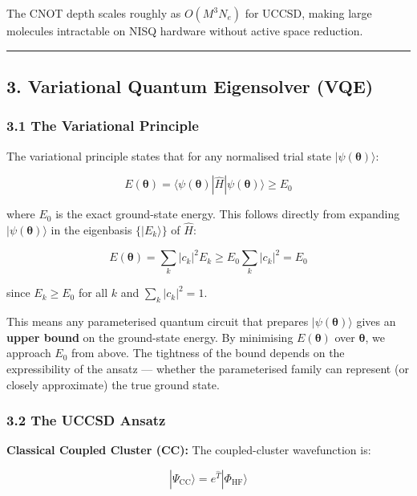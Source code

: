 \documentclass[
  11pt,
]{report}
\begin{document}
The CNOT depth scales roughly as \(O(M^3 N_e)\) for UCCSD, making large
molecules intractable on NISQ hardware without active space reduction.

\begin{center}\rule{0.5\linewidth}{0.5pt}\end{center}

\subsection{3. Variational Quantum Eigensolver
(VQE)}\label{variational-quantum-eigensolver-vqe}

\subsubsection{3.1 The Variational
Principle}\label{the-variational-principle}

The variational principle states that for any normalised trial state
\(|\psi(\boldsymbol{\theta})\rangle\):

\[E(\boldsymbol{\theta}) = \langle\psi(\boldsymbol{\theta})|\hat{H}|\psi(\boldsymbol{\theta})\rangle \geq E_0\]

where \(E_0\) is the exact ground-state energy. This follows directly
from expanding \(|\psi(\boldsymbol{\theta})\rangle\) in the eigenbasis
\(\{|E_k\rangle\}\) of \(\hat{H}\):

\[E(\boldsymbol{\theta}) = \sum_k |c_k|^2 E_k \geq E_0 \sum_k |c_k|^2 = E_0\]

since \(E_k \geq E_0\) for all \(k\) and \(\sum_k|c_k|^2 = 1\).

This means any parameterised quantum circuit that prepares
\(|\psi(\boldsymbol{\theta})\rangle\) gives an \textbf{upper bound} on
the ground-state energy. By minimising \(E(\boldsymbol{\theta})\) over
\(\boldsymbol{\theta}\), we approach \(E_0\) from above. The tightness
of the bound depends on the expressibility of the ansatz --- whether the
parameterised family can represent (or closely approximate) the true
ground state.

\subsubsection{3.2 The UCCSD Ansatz}\label{the-uccsd-ansatz}

\textbf{Classical Coupled Cluster (CC):} The coupled-cluster
wavefunction is:

\[|\Psi_{\text{CC}}\rangle = e^{\hat{T}}|\Phi_{\text{HF}}\rangle\]
\end{document}
